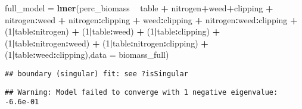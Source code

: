 \documentclass[
]{article}
\newenvironment{Shaded}{\begin{snugshade}}{\end{snugshade}}
\newcommand{\DataTypeTok}[1]{\textcolor[rgb]{0.13,0.29,0.53}{#1}}
\newcommand{\DecValTok}[1]{\textcolor[rgb]{0.00,0.00,0.81}{#1}}
\newcommand{\KeywordTok}[1]{\textcolor[rgb]{0.13,0.29,0.53}{\textbf{#1}}}
\newcommand{\NormalTok}[1]{#1}
\newcommand{\OperatorTok}[1]{\textcolor[rgb]{0.81,0.36,0.00}{\textbf{#1}}}
\newcommand{\StringTok}[1]{\textcolor[rgb]{0.31,0.60,0.02}{#1}}
\begin{document}
\begin{Shaded}
\begin{Highlighting}[]
\NormalTok{full_model =}\StringTok{ }\KeywordTok{lmer}\NormalTok{(perc_biomass }\OperatorTok{~}\StringTok{ }\NormalTok{table }\OperatorTok{+}\StringTok{ }
\StringTok{                    }\NormalTok{nitrogen}\OperatorTok{+}\NormalTok{weed}\OperatorTok{+}\NormalTok{clipping }\OperatorTok{+}\StringTok{ }\NormalTok{nitrogen}\OperatorTok{:}\NormalTok{weed }\OperatorTok{+}\StringTok{ }\NormalTok{nitrogen}\OperatorTok{:}\NormalTok{clipping }\OperatorTok{+}\StringTok{ }\NormalTok{weed}\OperatorTok{:}\NormalTok{clipping }\OperatorTok{+}\StringTok{ }\NormalTok{nitrogen}\OperatorTok{:}\NormalTok{weed}\OperatorTok{:}\NormalTok{clipping }\OperatorTok{+}
\StringTok{                    }\NormalTok{(}\DecValTok{1}\OperatorTok{|}\NormalTok{table}\OperatorTok{:}\NormalTok{nitrogen) }\OperatorTok{+}\StringTok{ }\NormalTok{(}\DecValTok{1}\OperatorTok{|}\NormalTok{table}\OperatorTok{:}\NormalTok{weed) }\OperatorTok{+}\StringTok{ }\NormalTok{(}\DecValTok{1}\OperatorTok{|}\NormalTok{table}\OperatorTok{:}\NormalTok{clipping) }\OperatorTok{+}\StringTok{ }
\StringTok{                    }\NormalTok{(}\DecValTok{1}\OperatorTok{|}\NormalTok{table}\OperatorTok{:}\NormalTok{nitrogen}\OperatorTok{:}\NormalTok{weed) }\OperatorTok{+}\StringTok{ }\NormalTok{(}\DecValTok{1}\OperatorTok{|}\NormalTok{table}\OperatorTok{:}\NormalTok{nitrogen}\OperatorTok{:}\NormalTok{clipping) }\OperatorTok{+}\StringTok{ }\NormalTok{(}\DecValTok{1}\OperatorTok{|}\NormalTok{table}\OperatorTok{:}\NormalTok{weed}\OperatorTok{:}\NormalTok{clipping),}\DataTypeTok{data =}\NormalTok{ biomass_full)}
\end{Highlighting}
\end{Shaded}

\begin{verbatim}
## boundary (singular) fit: see ?isSingular
\end{verbatim}

\begin{verbatim}
## Warning: Model failed to converge with 1 negative eigenvalue: -6.6e-01
\end{verbatim}
\end{document}
